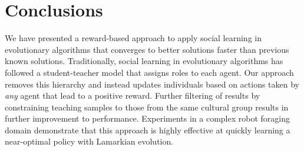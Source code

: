\documentclass{acm_proc_article-sp}
\begin{document}
\section{Conclusions}
\label{sec:conclusions}

We have presented a reward-based approach to apply social learning in evolutionary algorithms that converges to better solutions faster than previous known solutions. Traditionally, social learning in evolutionary algorithms has followed a student-teacher model that assigns roles to each agent. Our approach removes this hierarchy and instead updates individuals based on actions taken by \textit{any} agent that lead to a positive reward.  Further filtering of results by constraining teaching samples to those from the same cultural group results in further improvement to performance.  Experiments in a complex robot foraging domain demonstrate that this approach is highly effective at quickly learning a near-optimal policy with Lamarkian evolution. 



\end{document}
